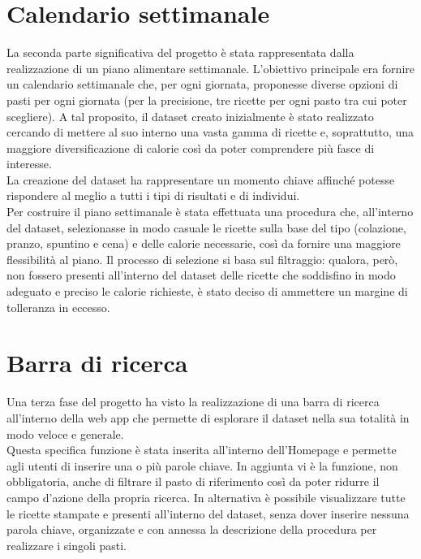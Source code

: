 \documentclass[11pt]{article}
\begin{document}
\section{Calendario settimanale}
La seconda parte significativa del progetto è stata rappresentata dalla realizzazione di un piano alimentare settimanale. L’obiettivo principale era fornire un calendario settimanale che, per ogni giornata, proponesse diverse opzioni di pasti per ogni giornata (per la precisione, tre ricette per ogni pasto tra cui poter scegliere). A tal proposito, il dataset creato inizialmente è stato realizzato cercando di mettere al suo interno una vasta gamma di ricette e, soprattutto, una maggiore diversificazione di calorie così da poter comprendere più fasce di interesse.\\
La creazione del dataset ha rappresentare un momento chiave affinché potesse rispondere al meglio a tutti i tipi di risultati e di individui.\\
Per costruire il piano settimanale è stata effettuata una procedura che, all’interno del dataset,  selezionasse in modo casuale le ricette sulla base del tipo (colazione, pranzo, spuntino e cena) e delle calorie necessarie, così da fornire una maggiore flessibilità al piano. Il processo di selezione si basa sul filtraggio: qualora, però, non fossero presenti all'interno del dataset delle ricette che soddisfino in modo adeguato e preciso le calorie richieste, è stato deciso di ammettere un margine di tolleranza in eccesso. 
\section{Barra di ricerca} Una terza fase del progetto ha visto la realizzazione di una barra di ricerca all'interno della web app che permette di esplorare il dataset nella sua totalità in modo veloce e generale.\\
Questa specifica funzione è stata inserita all’interno dell’Homepage e permette agli utenti di inserire una o più parole chiave. In aggiunta vi è la funzione, non obbligatoria, anche di filtrare il pasto di riferimento così da poter ridurre il campo d'azione della propria ricerca. In alternativa è possibile visualizzare tutte le ricette stampate e presenti all’interno del dataset, senza dover inserire nessuna parola chiave, organizzate e con annessa la descrizione della procedura per realizzare i singoli pasti. 
\end{document}
